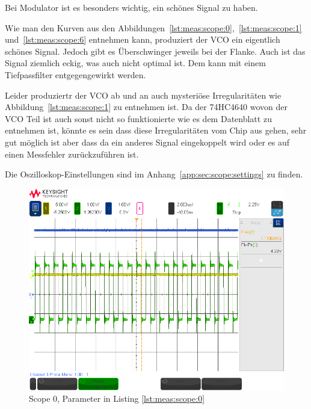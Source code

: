 Bei Modulator ist es besonders wichtig, ein sch\"ones Signal zu haben.

Wie               man               den               Kurven               aus
den                 Abbildungen~\ref{lst:meas:scope:0},~\ref{lst:meas:scope:1}
und~\ref{lst:meas:scope:6} entnehmen  kann, produziert der VCO  ein eigentlich
sch\"ones Signal. Jedoch gibt es  \"Uberschwinger jeweils bei der Flanke. Auch
ist das Signal ziemlich eckig, was  auch nicht optimal ist. Dem kann mit einem
Tiefpassfilter entgegengewirkt werden.

Leider produziertr der  VCO ab und an auch  mysteri\"ose Irregularit\"aten wie
Abbildung~\ref{lst:meas:scope:1} zu  entnehmen ist. Da der 74HC4640  wovon der
VCO  Teil ist  auch sonst  nicht  so funktionierte  wie es  dem Datenblatt  zu
entnehmen  ist, k\"onnte  es sein  dass diese  Irregularit\"aten vom  Chip aus
gehen, sehr  gut m\"oglich ist  aber dass  da ein anderes  Signal eingekoppelt
wird oder es auf einen Messfehler zur\"uckzuf\"uhren ist.

Die Oszilloskop-Einstellungen  sind im  Anhang~\ref{app:sec:scope:settings} zu
finden.

\begin{figure}[h!tb]
    \centering
    \includegraphics[width=1\textwidth, trim=0mm 21mm 0mm 11mm, clip]{images/scopeShots/scope_0b.png}
    \caption{Scope 0, Parameter in Listing \ref{lst:meas:scope:0}}
    \label{fig:meas:scope:0}
\end{figure}

